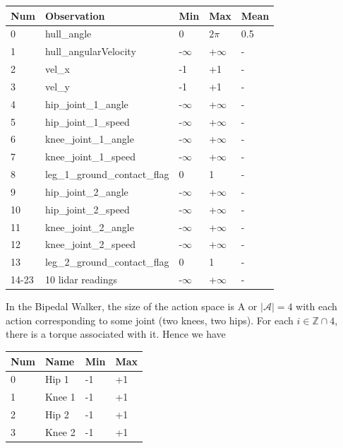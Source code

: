 \documentclass[doc, onecolumn, 12pt]{apa6}
\begin{document}
\begin{table}[H]
\begin{tabular}{|l|l|l|l|l|}
\hline
Num   & Observation                   & Min  & Max  & Mean \\ \hline
0     & hull\_angle                   & 0    & $2 \pi$ & 0.5  \\ \hline
1     & hull\_angularVelocity         & -$\infty$ & +$\infty$ & -    \\ \hline
2     & vel\_x                        & -1   & +1   & -    \\ \hline
3     & vel\_y                        & -1   & +1   & -    \\ \hline
4     & hip\_joint\_1\_angle          & -$\infty$& +$\infty$& -    \\ \hline
5     & hip\_joint\_1\_speed          & -$\infty$ & +$\infty$& -    \\ \hline
6     & knee\_joint\_1\_angle         & -$\infty$& +$\infty$& -    \\ \hline
7     & knee\_joint\_1\_speed         & -$\infty$& +$\infty$& -    \\ \hline
8     & leg\_1\_ground\_contact\_flag & 0    & 1    & -    \\ \hline
9     & hip\_joint\_2\_angle          & -$\infty$& +$\infty$& -    \\ \hline
10    & hip\_joint\_2\_speed          & -$\infty$& +$\infty$& -    \\ \hline
11    & knee\_joint\_2\_angle         & -$\infty$& +$\infty$& -    \\ \hline
12    & knee\_joint\_2\_speed         & -$\infty$& +$\infty$& -    \\ \hline
13    & leg\_2\_ground\_contact\_flag & 0    & 1    & -    \\ \hline
14-23 & 10 lidar readings             & -$\infty$& +$\infty$& - \\  \hline
\end{tabular}
\end{table}

In the Bipedal Walker, the size of the action space is A or $\vert \mathcal{A} \vert = 4$ with each action corresponding to some joint (two knees, two hips). For each $i \in \mathbb{Z} \cap 4$, there is a torque associated with it. Hence we have

\begin{table}[H]
\begin{tabular}{|l|l|l|l|}
\hline
Num & Name   & Min & Max \\ \hline
0   & Hip 1  & -1  & +1  \\ \hline
1   & Knee 1 & -1  & +1  \\ \hline
2   & Hip 2  & -1  & +1  \\ \hline
3   & Knee 2 & -1  & +1  \\ \hline
\end{tabular}
\end{table}
\end{document}
